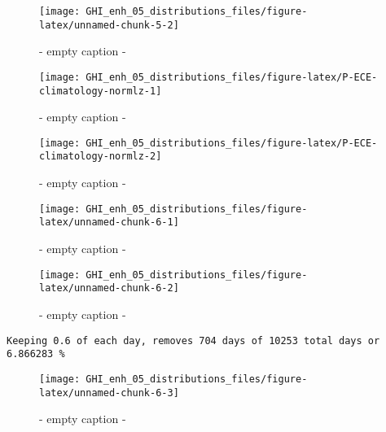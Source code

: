 \documentclass[
  10pt,
  a4paper,oneside]{article}
\begin{document}
\begin{figure}[H]

{\centering \texttt{[image: GHI\_enh\_05\_distributions\_files/figure-latex/unnamed-chunk-5-2]} 

}

\caption{ - empty caption - }\label{fig:unnamed-chunk-5-2}
\end{figure}
\begin{figure}[H]

{\centering \texttt{[image: GHI\_enh\_05\_distributions\_files/figure-latex/P-ECE-climatology-normlz-1]} 

}

\caption{ - empty caption - }\label{fig:P-ECE-climatology-normlz-1}
\end{figure}
\begin{figure}[H]

{\centering \texttt{[image: GHI\_enh\_05\_distributions\_files/figure-latex/P-ECE-climatology-normlz-2]} 

}

\caption{ - empty caption - }\label{fig:P-ECE-climatology-normlz-2}
\end{figure}
\begin{figure}[H]

{\centering \texttt{[image: GHI\_enh\_05\_distributions\_files/figure-latex/unnamed-chunk-6-1]} 

}

\caption{ - empty caption - }\label{fig:unnamed-chunk-6-1}
\end{figure}
\begin{figure}[H]

{\centering \texttt{[image: GHI\_enh\_05\_distributions\_files/figure-latex/unnamed-chunk-6-2]} 

}

\caption{ - empty caption - }\label{fig:unnamed-chunk-6-2}
\end{figure}

\begin{verbatim}
Keeping 0.6 of each day, removes 704 days of 10253 total days or 6.866283 %
\end{verbatim}

\begin{figure}[H]

{\centering \texttt{[image: GHI\_enh\_05\_distributions\_files/figure-latex/unnamed-chunk-6-3]} 

}

\caption{ - empty caption - }\label{fig:unnamed-chunk-6-3}
\end{figure}
\end{document}
